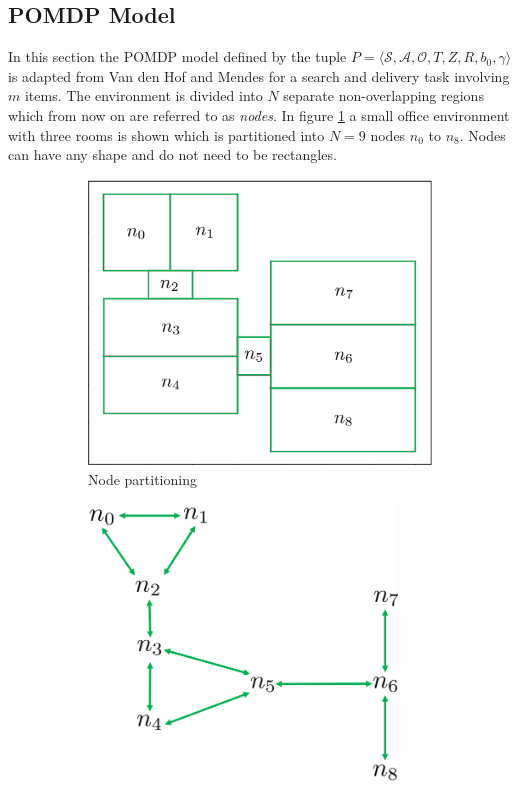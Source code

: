 \subsection{POMDP Model}\label{subsec:POMDPmodel}
In this section the POMDP model defined by the tuple $P = \langle \mathcal{S}, \mathcal{A}, \mathcal{O}, T, Z, R, b_0, \gamma \rangle$ is adapted from Van den Hof \cite{Vandenhof} and Mendes \cite{Mendes11} for a search and delivery task involving $m$ items. The environment is divided into $N$ separate non-overlapping regions which from now on are referred to as \textit{nodes}. In figure \ref{subfig:nodes} a small office environment with three rooms is shown which is partitioned into $N=9$ nodes $n_0$ to $n_8$. Nodes can have any shape and do not need to be rectangles.
\begin{figure}
    \centering
    \begin{subfigure}[b]{0.48\textwidth}
        \includegraphics[width=1.0\textwidth]{Report/images/envsmall_l2.png}
        \caption{Node partitioning}
        \label{subfig:nodes}
    \end{subfigure}
    \begin{subfigure}[b]{0.48\textwidth}
    \includegraphics[width=0.9\textwidth]{Report/images/nodeconnectiongraph.png}

\end{subfigure}
\end{figure}

